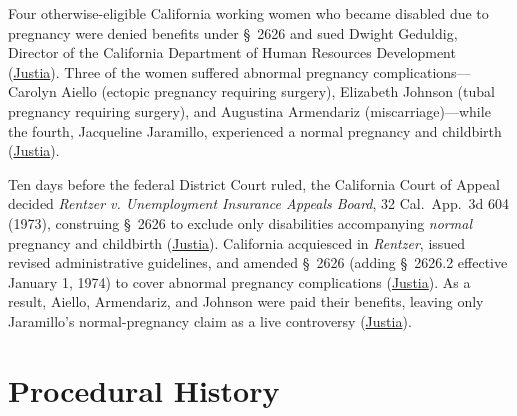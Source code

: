 \documentclass[12pt]{article}
\begin{document}
Four otherwise-eligible California working women who became disabled due to pregnancy were denied benefits under \S~2626 and sued Dwight Geduldig, Director of the California Department of Human Resources Development (\href{https://supreme.justia.com/cases/federal/us/417/484/}{Justia}). Three of the women suffered abnormal pregnancy complications---Carolyn Aiello (ectopic pregnancy requiring surgery), Elizabeth Johnson (tubal pregnancy requiring surgery), and Augustina Armendariz (miscarriage)---while the fourth, Jacqueline Jaramillo, experienced a normal pregnancy and childbirth (\href{https://supreme.justia.com/cases/federal/us/417/484/}{Justia}).

Ten days before the federal District Court ruled, the California Court of Appeal decided \textit{Rentzer v. Unemployment Insurance Appeals Board}, 32 Cal.\ App.\ 3d 604 (1973), construing \S~2626 to exclude only disabilities accompanying \textit{normal} pregnancy and childbirth (\href{https://supreme.justia.com/cases/federal/us/417/484/}{Justia}). California acquiesced in \textit{Rentzer}, issued revised administrative guidelines, and amended \S~2626 (adding \S~2626.2 effective January 1, 1974) to cover abnormal pregnancy complications (\href{https://supreme.justia.com/cases/federal/us/417/484/}{Justia}). As a result, Aiello, Armendariz, and Johnson were paid their benefits, leaving only Jaramillo's normal-pregnancy claim as a live controversy (\href{https://supreme.justia.com/cases/federal/us/417/484/}{Justia}).

\section{Procedural History}
\end{document}
